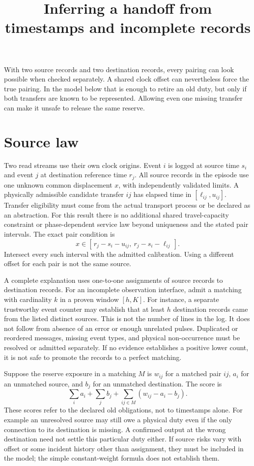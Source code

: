 \documentclass[11pt]{article}
\title{Inferring a handoff from timestamps and incomplete records}
\date{}
\begin{document}
\maketitle

With two source records and two destination records, every pairing
can look possible when checked separately. A shared clock offset
can nevertheless force the true pairing. In the model below that
is enough to retire an old duty, but only if both transfers are
known to be represented. Allowing even one missing transfer
can make it unsafe to release the same reserve.

\section{Source law}
Two read streams use their own clock origins. Event \(i\) is
logged at source time \(s_i\) and event \(j\) at destination
reference time \(r_j\). All source records in the episode
use one unknown common displacement \(x\), with independently
validated limits. A physically admissible candidate transfer
\(ij\) has elapsed time in \([\ell_{ij},u_{ij}]\). Transfer
eligibility must come from the actual transport process or be
declared as an abstraction. For this result there is no
additional shared travel-capacity constraint or phase-dependent
service law beyond uniqueness and the stated pair intervals.
The exact pair condition is
\[
        x \in [\,r_j-s_i-u_{ij},\ r_j-s_i-\ell_{ij}\,].
\]
Intersect every such interval with the admitted calibration.
Using a different offset for each pair is not the same source.

A complete explanation uses one-to-one assignments of source
records to destination records. For an incomplete observation
interface, admit a matching with cardinality \(k\) in a proven
window \([h,K]\). For instance, a separate trustworthy
event counter may establish that at least \(h\) destination
records came from the listed distinct sources. This is not
the number of lines in the log. It does not follow from
absence of an error or enough unrelated pulses. Duplicated
or reordered messages, missing event types, and physical
non-occurrence must be resolved or admitted separately.
If no evidence establishes a positive lower count, it is
not safe to promote the records to a perfect matching.

Suppose the reserve exposure in a matching \(M\) is \(w_{ij}\)
for a matched pair \(ij\), \(a_i\) for an unmatched source,
and \(b_j\) for an unmatched destination. The score is
\[
 \sum_i a_i+\sum_j b_j+
     \sum_{ij\in M}(w_{ij}-a_i-b_j).
\]
These scores refer to the declared old obligations, not to
timestamps alone. For example an unresolved source may still
owe a physical duty even if the only connection to its destination
is missing. A confirmed output at the wrong destination need
not settle this particular duty either. If source risks vary
with offset or some incident history other than assignment,
they must be included in the model; the simple constant-weight
formula does not establish them.
\end{document}
